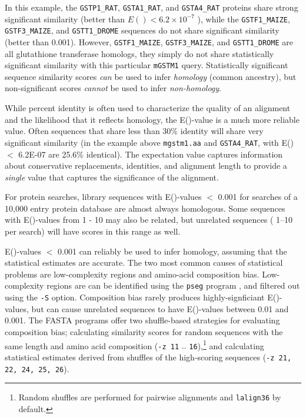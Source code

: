 \documentclass[11pt]{article}
\begin{document}
In this example, the \texttt{GSTP1\_RAT}, \texttt{GSTA1\_RAT}, and
\texttt{GSTA4\_RAT} proteins share strong significant similarity
(better than $E() < 6.2 \times 10^{-7}$ ), while the
\texttt{GSTF1\_MAIZE}, \texttt{GSTF3\_MAIZE}, and
\texttt{GSTT1\_DROME} sequences do not share significant similarity
(better than 0.001).  However, \texttt{GSTF1\_MAIZE},
\texttt{GSTF3\_MAIZE}, and \texttt{GSTT1\_DROME} are all glutathione
transferase homologs, they simply do not share statistically
significant similarity with this particular \texttt{mGSTM1} query.
Statistically significant sequence similarity scores \emph{can} be
used to infer \emph{homology} (common ancestry), but non-significant
scores \emph{cannot} be used to infer \emph{non-homology}.

While percent identity is often used to characterize the quality of an
alignment and the likelihood that it reflects homology, the E()-value
is a much more reliable value.  Often sequences that share less than
30\% identity will share very significant similarity (in the example
above \texttt{mgstm1.aa} and \texttt{GSTA4\_RAT}, with E() $<$ 6.2E-07
are 25.6\% identical).  The expectation value captures information
about conservative replacements, identities, and alignment length to
provide a \emph{single} value that captures the significance of the
alignment.

For protein searches, library sequences with E()-values $<$ 0.001 for
searches of a 10,000 entry protein database are almost always
homologous. Some sequences with E()-values from 1 - 10 may also be
related, but unrelated sequences ( 1--10 per search) will have scores
in this range as well.

E()-values $<$ 0.001 can reliably be used to infer homology, assuming
that the statistical estimates are accurate.  The two most common
causes of statistical problems are low-complexity regions and
amino-acid composition bias.  Low-complexity regions are can be
identified using the \texttt{pseg} program \cite{woo935}, and filtered
out using the \texttt{-S} option. Composition bias rarely produces
highly-signficiant E()-values, but can cause unrelated sequences to
have E()-values between 0.01 and 0.001. The FASTA programs offer two
shuffle-based strategies for evaluating composition bias; calculating
similarity scores for random sequences with the same length and amino
acid composition (\texttt{-z 11} $..$ \texttt{16}),\footnote{Random
  shuffles are performed for pairwise alignments and \texttt{lalign36}
  by default.} and calculating statistical estimates derived from
shuffles of the high-scoring sequences (\texttt{-z 21, 22, 24, 25,
  26}).
\end{document}
